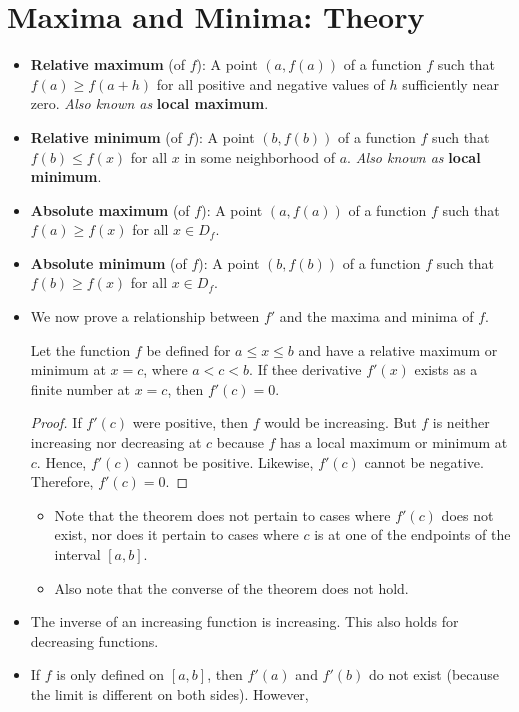 \documentclass[../main.tex]{subfiles}
\begin{document}
\section{Maxima and Minima: Theory}
\begin{itemize}
    \item \textbf{Relative maximum} (of $f$): A point $(a,f(a))$ of a function $f$ such that $f(a)\geq f(a+h)$ for all positive and negative values of $h$ sufficiently near zero. \emph{Also known as} \textbf{local maximum}.
    \item \textbf{Relative minimum} (of $f$): A point $(b,f(b))$ of a function $f$ such that $f(b)\leq f(x)$ for all $x$ in some neighborhood of $a$. \emph{Also known as} \textbf{local minimum}.
    \item \textbf{Absolute maximum} (of $f$): A point $(a,f(a))$ of a function $f$ such that $f(a)\geq f(x)$ for all $x\in D_f$.
    \item \textbf{Absolute minimum} (of $f$): A point $(b,f(b))$ of a function $f$ such that $f(b)\geq f(x)$ for all $x\in D_f$.
    \item We now prove a relationship between $f'$ and the maxima and minima of $f$.
    \begin{thm}
        Let the function $f$ be defined for $a\leq x\leq b$ and have a relative maximum or minimum at $x=c$, where $a<c<b$. If thee derivative $f'(x)$ exists as a finite number at $x=c$, then $f'(c)=0$.
        \begin{proof}
            If $f'(c)$ were positive, then $f$ would be increasing. But $f$ is neither increasing nor decreasing at $c$ because $f$ has a local maximum or minimum at $c$. Hence, $f'(c)$ cannot be positive. Likewise, $f'(c)$ cannot be negative. Therefore, $f'(c)=0$.
        \end{proof}
    \end{thm}
    \begin{itemize}
        \item Note that the theorem does not pertain to cases where $f'(c)$ does not exist, nor does it pertain to cases where $c$ is at one of the endpoints of the interval $[a,b]$.
        \item Also note that the converse of the theorem does not hold.
    \end{itemize}
    \item The inverse of an increasing function is increasing. This also holds for decreasing functions.
    \item If $f$ is only defined on $[a,b]$, then $f'(a)$ and $f'(b)$ do not exist (because the limit is different on both sides). However,

\end{itemize}
\end{document}
